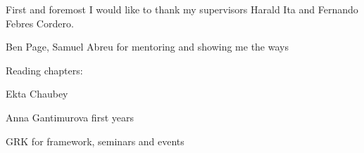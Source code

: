 First and foremost I would like to thank my supervisors Harald Ita and Fernando Febres Cordero.

Ben Page, Samuel Abreu for mentoring and showing me the ways


Reading chapters:

Ekta Chaubey


Anna Gantimurova first years

GRK for framework, seminars and events







